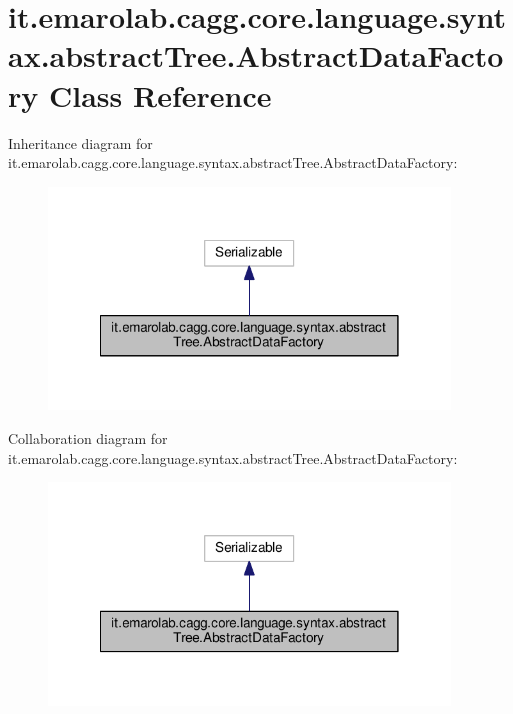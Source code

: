 \hypertarget{classit_1_1emarolab_1_1cagg_1_1core_1_1language_1_1syntax_1_1abstractTree_1_1AbstractDataFactory}{\section{it.\-emarolab.\-cagg.\-core.\-language.\-syntax.\-abstract\-Tree.\-Abstract\-Data\-Factory Class Reference}
\label{classit_1_1emarolab_1_1cagg_1_1core_1_1language_1_1syntax_1_1abstractTree_1_1AbstractDataFactory}
}


Inheritance diagram for it.\-emarolab.\-cagg.\-core.\-language.\-syntax.\-abstract\-Tree.\-Abstract\-Data\-Factory\-:\nopagebreak
\begin{figure}[H]
\begin{center}
\leavevmode
\includegraphics[width=302pt]{classit_1_1emarolab_1_1cagg_1_1core_1_1language_1_1syntax_1_1abstractTree_1_1AbstractDataFactory__inherit__graph}
\end{center}
\end{figure}


Collaboration diagram for it.\-emarolab.\-cagg.\-core.\-language.\-syntax.\-abstract\-Tree.\-Abstract\-Data\-Factory\-:\nopagebreak
\begin{figure}[H]
\begin{center}
\leavevmode
\includegraphics[width=302pt]{classit_1_1emarolab_1_1cagg_1_1core_1_1language_1_1syntax_1_1abstractTree_1_1AbstractDataFactory__coll__graph}
\end{center}
\end{figure}
